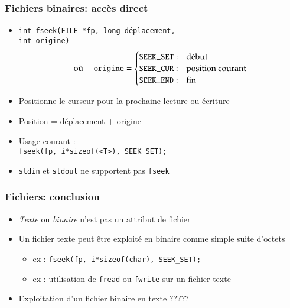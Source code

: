 \documentclass[table,handout,tikz,12pt,svgnames]{beamer}
\begin{document}
\begin{frame}[fragile=singleslide]
	\frametitle{Fichiers binaires: accès direct}
	\begin{block}{}
		\begin{itemize}
			\item \texttt{int fseek(FILE *fp, long déplacement,}\\
			\hspace{11em}\texttt{int origine)}
			\small
			\[
			\hspace{-0cm}
			\text{où   }
			\hspace{0.5em}
			\texttt{    origine}= 
			\begin{cases}
			\texttt{SEEK\_SET}: & \text{début}\\
			\texttt{SEEK\_CUR}: & \text{position courant}\\
			\texttt{SEEK\_END}: & \text{fin}
			\end{cases}
			\]
			\item Positionne le curseur pour la prochaine lecture ou écriture
			\item Position = déplacement + origine
			\item Usage courant : \\
			\texttt{fseek(fp, i*sizeof(<T>), SEEK\_SET);}
            \item \texttt{stdin} et \texttt{stdout} ne supportent pas \texttt{fseek}
		\end{itemize}
	\end{block}
\end{frame}


\begin{frame}[fragile=singleslide]
	\frametitle{Fichiers: conclusion}
	\begin{block}{}
		\begin{itemize}
			\item \textit{Texte} ou \textit{binaire} n'est pas un attribut de fichier
			\item Un fichier texte peut être exploité en binaire comme simple suite d'octets
			\begin{itemize}
				\item ex : \texttt{fseek(fp, i*sizeof(char), SEEK\_SET);}
				\item ex : utilisation de \texttt{fread} ou \texttt{fwrite} sur un fichier texte
			\end{itemize}
			\item Exploitation d'un fichier binaire en texte ?????
		\end{itemize}
	\end{block}
\end{frame}
\end{document}
